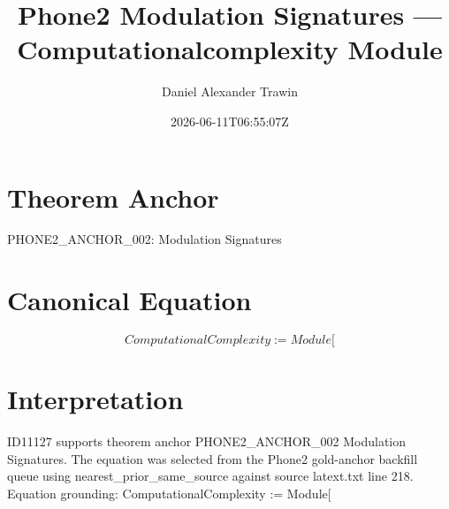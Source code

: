 \documentclass[11pt]{article}
\title{Phone2 Modulation Signatures — Computationalcomplexity Module}
\author{Daniel Alexander Trawin}
\date{2026-06-11T06:55:07Z}
\begin{document}
\maketitle
\section*{Theorem Anchor}
PHONE2_ANCHOR_002: Modulation Signatures
\section*{Canonical Equation}
\[
ComputationalComplexity := Module[
\]
\section*{Interpretation}
ID11127 supports theorem anchor PHONE2_ANCHOR_002 Modulation Signatures. The equation was selected from the Phone2 gold-anchor backfill queue using nearest_prior_same_source against source latext.txt line 218. Equation grounding: ComputationalComplexity := Module[
\end{document}

